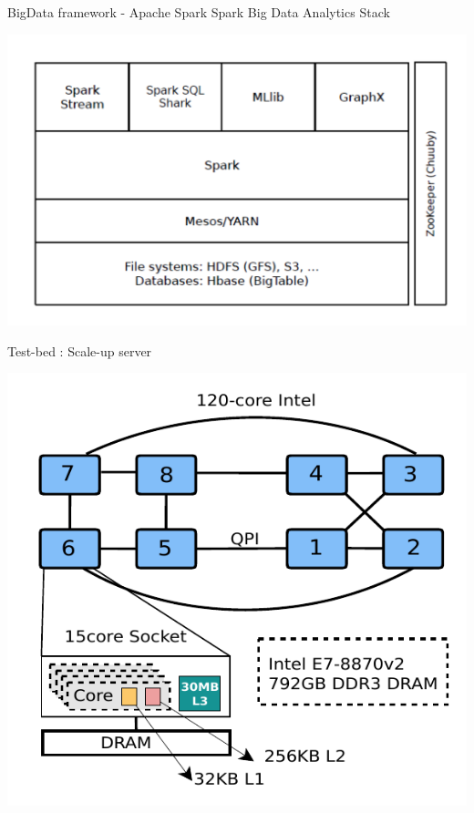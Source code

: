 \documentclass[english]{beamer} %
\begin{document}
\begin{frame}{BigData framework - Apache Spark}
Spark Big Data Analytics Stack
\begin{center}
\includegraphics[scale=0.5]{fig/bigdatastack}
\end{center}
\end{frame}

\begin{frame}{Test-bed : Scale-up server}
\begin{center}
\includegraphics[scale=0.8]{fig/xeon}
\end{center}
\end{frame}
\end{document}
